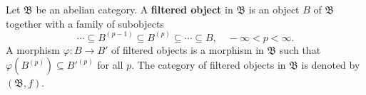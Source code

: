 Let $\mathfrak{B}$ be an abelian category. A \textbf{filtered object} in $\mathfrak{B}$ is an object $B$ of $\mathfrak{B}$ together with a family of subobjects
$$
\cdots \subseteq B^{(p-1)} \subseteq B^{(p)} \subseteq \cdots \subseteq B, \quad -\infty < p < \infty.
$$
A morphism $\varphi : B \to B'$ of filtered objects is a morphism in $\mathfrak{B}$ such that $\varphi(B^{(p)}) \subseteq B'^{(p)}$ for all $p$. The category of filtered objects in $\mathfrak{B}$ is denoted by $(\mathfrak{B}, f)$.
